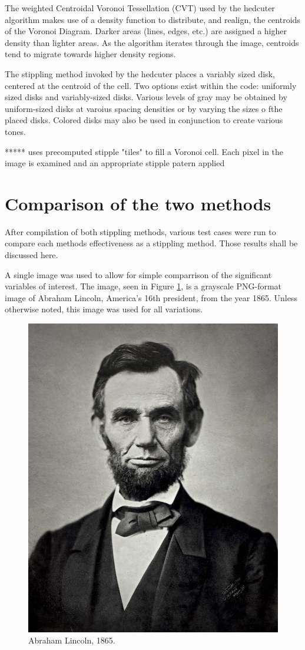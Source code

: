 \documentclass[11pt]{article}
\begin{document}
The weighted Centroidal Voronoi Tessellation (CVT) used by the hedcuter algorithm makes use of a density function to distribute, and realign, the centroids of the Voronoi Diagram. Darker areas (lines, edges, etc.) are assigned a higher density than lighter areas. As the algorithm iterates through the image, centroids tend to migrate towards higher density regions.

The stippling method invoked by the hedcuter places a variably sized disk, centered at the centroid of the cell. Two options exist within the code: uniformly sized disks and variably-sized disks. Various levels of gray may be obtained by uniform-sized disks at varoius spacing densities or by varying the sizes o fthe placed disks. Colored disks may also be used in conjunction to create various tones. \cite{Secord:2002:WVS:508530.508537}

***** uses precomputed stipple "tiles" to fill a Voronoi cell. Each pixel in the image is examined and an appropriate stipple patern applied 

\section{Comparison of the two methods}
After compilation of both stippling methods, various test cases were run to compare each methods effectiveness as a stippling method. Those results shall be discussed here.

A single image was used to allow for simple comparrison of the significant variables of interest. The image, seen in Figure \ref{fig:AbrahamLincoln}, is a grayscale PNG-format  image of Abraham Lincoln, America's 16th president, from the year 1865. Unless otherwise noted, this image was used for all variations.

\begin{figure}[H]
	\centering
	\includegraphics[width=0.5\linewidth]{pix/Abraham_Lincoln_November_1863.png}
	\caption{Abraham Lincoln, 1865.}
	\label{fig:AbrahamLincoln}
\end{figure}
\end{document}
